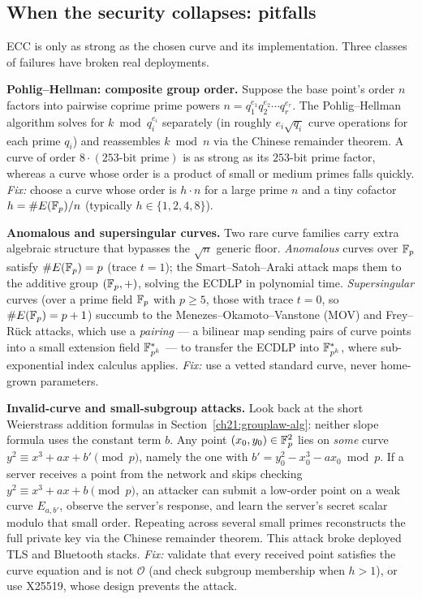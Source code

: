 \subsection{When the security collapses: pitfalls}
\label{ch21:pitfalls}

ECC is only as strong as the chosen curve and its implementation. Three classes of
failures have broken real deployments.

\begin{attackbox}
\textbf{Pohlig--Hellman: composite group order.} Suppose the base point's order $n$
factors into pairwise coprime prime powers $n = q_1^{e_1} q_2^{e_2} \cdots q_r^{e_r}$.
The Pohlig--Hellman algorithm solves for $k \bmod q_i^{e_i}$ separately (in roughly
$e_i \sqrt{q_i}$ curve operations for each prime $q_i$) and reassembles $k \bmod n$ via
the Chinese remainder theorem. A curve of order $8 \cdot (\text{$253$-bit prime})$ is as
strong as its $253$-bit prime factor, whereas a curve whose order is a product of small or
medium primes falls quickly. \emph{Fix:} choose a curve whose order is $h \cdot n$ for a
large prime $n$ and a tiny cofactor $h = \#E(\mathbb{F}_p)/n$ (typically $h \in \{1,2,4,8\}$).
\end{attackbox}

\begin{attackbox}
\textbf{Anomalous and supersingular curves.} Two rare curve families carry extra algebraic
structure that bypasses the $\sqrt{n}$ generic floor. \emph{Anomalous} curves over $\mathbb{F}_p$
satisfy $\#E(\mathbb{F}_p) = p$ (trace $t = 1$); the Smart--Satoh--Araki attack maps them to the
additive group $(\mathbb{F}_p, +)$, solving the ECDLP in polynomial time. \emph{Supersingular}
curves (over a prime field $\mathbb{F}_p$ with $p \ge 5$, those with trace $t = 0$, so
$\#E(\mathbb{F}_p) = p + 1$) succumb to the Menezes--Okamoto--Vanstone (MOV) and Frey--R\"uck
attacks, which use a \emph{pairing} --- a bilinear map sending pairs of curve points into
a small extension field $\mathbb{F}_{p^k}^{*}$ --- to transfer the ECDLP into $\mathbb{F}_{p^k}^{*}$,
where sub-exponential index calculus applies. \emph{Fix:} use a vetted standard curve,
never home-grown parameters.
\end{attackbox}

\begin{attackbox}
\textbf{Invalid-curve and small-subgroup attacks.} Look back at the short Weierstrass
addition formulas in Section~\ref{ch21:grouplaw-alg}: neither slope formula uses the
constant term $b$. Any point $(x_0, y_0) \in \mathbb{F}_p^2$ lies on \emph{some} curve
$y^2 \equiv x^3 + ax + b' \pmod p$, namely the one with $b' = y_0^2 - x_0^3 - ax_0 \bmod p$.
If a server receives a point from the network and skips checking $y^2 \equiv x^3 + ax + b
\pmod p$, an attacker can submit a low-order point on a weak curve $E_{a,b'}$, observe the
server's response, and learn the server's secret scalar modulo that small order. Repeating
across several small primes reconstructs the full private key via the Chinese remainder
theorem. This attack broke deployed TLS and Bluetooth stacks. \emph{Fix:} validate that
every received point satisfies the curve equation and is not $\mathcal{O}$ (and check
subgroup membership when $h > 1$), or use X25519, whose design prevents the attack.
\end{attackbox}

